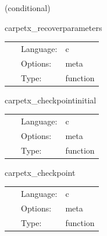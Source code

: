 \vspace{5mm}

   (conditional) 

\hspace{5mm} carpetx\_recoverparameters 

\hspace{5mm}{\it recover parameters } 


\hspace{5mm}

 \begin{tabular*}{160mm}{cll} 
~ & Language:  & c \\ 
~ & Options:  & meta \\ 
~ & Type:  & function \\ 
\end{tabular*} 


\vspace{5mm}


\hspace{5mm} carpetx\_checkpointinitial 

\hspace{5mm}{\it checkpoint initial conditions } 


\hspace{5mm}

 \begin{tabular*}{160mm}{cll} 
~ & Language:  & c \\ 
~ & Options:  & meta \\ 
~ & Type:  & function \\ 
\end{tabular*} 


\vspace{5mm}


\hspace{5mm} carpetx\_checkpoint 

\hspace{5mm}{\it checkpoint } 


\hspace{5mm}

 \begin{tabular*}{160mm}{cll} 
~ & Language:  & c \\ 
~ & Options:  & meta \\ 
~ & Type:  & function \\ 
\end{tabular*} 



